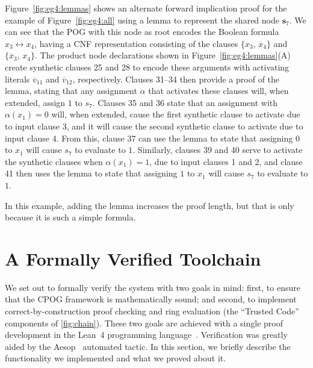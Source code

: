 \documentclass[twoside,11pt]{article}
\newcommand{\obar}[1]{\overline{#1}}
\newcommand{\assign}{\alpha}
\newcommand{\makenode}[1]{\mathbf{#1}}
\newcommand{\nodes}{\makenode{s}}
\newcommand{\lean}{Lean~4}
\begin{document}
Figure~\ref{fig:eg4:lemmas} shows an alternate forward implication
proof for the example of Figure~\ref{fig:eg4:all} using a lemma to
represent the shared node $\nodes_7$.  We can see that the POG with
this node as root encodes the Boolean formula $x_3 \leftrightarrow x_4$, having a CNF representation consisting of the clauses
$\{x_3 ,\, \obar{x}_4\}$ and $\{\obar{x}_3 ,\, {x}_4\}$.  The product node
declarations shown in Figure~\ref{fig:eg4:lemmas}(A) create synthetic
clauses 25 and 28 to encode these arguments with activating literals
$\obar{v}_{11}$ and $\obar{v}_{12}$, respectively.  Clauses 31--34
then provide a proof of the lemma, stating that any assignment
$\assign$ that activates these clauses will, when extended,  assign $1$ to $s_7$.
Clauses 35 and 36 state that an assignment with $\assign(x_1) = 0$
will, when extended, cause the first synthetic clause to activate due to input clause
3, and it will cause the second synthetic clause to activate due to
input clause 4.  From this, clause 37 can use the lemma to state that
assigning $0$ to $x_1$ will cause $s_7$ to evaluate to $1$.  Similarly,
clauses 39 and 40 serve to activate the synthetic clauses when
$\assign(x_1) = 1$, due to input clauses 1 and 2, and clause 41 then
uses the lemma to state that assigning $1$ to $x_1$ will cause $s_7$ to
evaluate to $1$.

In this example, adding the lemma increases the proof length, but that
is only because it is such a simple formula.



\section{A Formally Verified Toolchain}
\label{section:formally-verified-toolchain}

We set out to formally verify the system with two goals in mind: first, to ensure that the CPOG framework is mathematically
sound; and second, to implement correct-by-construction proof checking and ring evaluation (the ``Trusted Code'' components of \ref{fig:chain}). These two goals are achieved with a single proof development in the \lean{} programming language~\cite{demoura:cade:2021}. Verification was greatly aided by the Aesop~\cite{23limperg_aesop_white_box_best_first_proof_search_lean} automated tactic. In this section, we briefly describe the functionality we implemented and what we proved about it.
\end{document}
